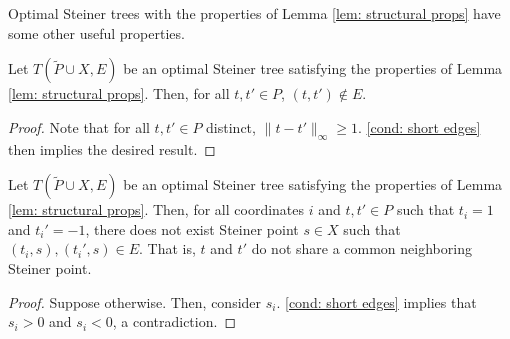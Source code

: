 \documentclass{theoretics}
\newcommand{\1}{\textbf{1}}
\renewcommand{\tilde}{\widetilde}
\begin{document}
Optimal Steiner trees with the properties of Lemma \ref{lem: structural props} have some other useful properties.

\begin{corollary} \label{cor: no term term edges}
Let $T(\tilde{P} \cup X, E)$ be an optimal Steiner tree satisfying the properties of Lemma \ref{lem: structural props}. Then, for all $t,t' \in P$, $(t,t') \not\in E$.
\end{corollary}
\begin{proof}
Note that for all $t, t' \in P$ distinct, $\|t - t'\|_{\infty} \geq 1$. \ref{cond: short edges} then implies the desired result.
\end{proof}

\begin{corollary} \label{cor: independence struct}
Let $T(\tilde{P} \cup X, E)$ be an optimal Steiner tree satisfying the properties of Lemma \ref{lem: structural props}. Then, for all coordinates $i$ and  $t,t' \in P$ such that $t_i = 1$ and $t_i' = -1$, there does not exist Steiner point $s \in X$ such that $(t_i,s), (t_i', s) \in E$. That is, $t$ and $t'$ do not share a common neighboring Steiner point.
\end{corollary}
\begin{proof}
Suppose otherwise. Then, consider $s_i$. \ref{cond: short edges} implies that $s_i > 0$ and $s_i < 0$, a contradiction.
\end{proof}
\end{document}
